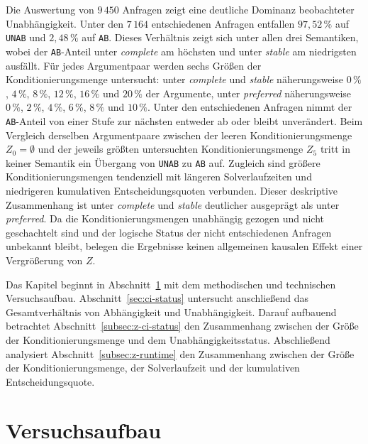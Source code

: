 Die Auswertung von \(9\,450\) Anfragen zeigt eine deutliche Dominanz
beobachteter Unabhängigkeit. Unter den \(7\,164\) entschiedenen Anfragen
entfallen \(97{,}52\,\%\) auf \texttt{UNAB} und \(2{,}48\,\%\) auf
\texttt{AB}. Dieses Verhältnis zeigt sich unter allen drei Semantiken, wobei
der \texttt{AB}-Anteil unter \emph{complete} am höchsten und unter
\emph{stable} am niedrigsten ausfällt. Für jedes Argumentpaar werden sechs
Größen der Konditionierungsmenge untersucht: unter \emph{complete} und
\emph{stable} näherungsweise \(0\,\%\), \(4\,\%\), \(8\,\%\),
\(12\,\%\), \(16\,\%\) und \(20\,\%\) der Argumente, unter
\emph{preferred} näherungsweise \(0\,\%\), \(2\,\%\), \(4\,\%\),
\(6\,\%\), \(8\,\%\) und \(10\,\%\). Unter den entschiedenen Anfragen
nimmt der \texttt{AB}-Anteil von einer Stufe zur nächsten entweder ab oder
bleibt unverändert. Beim Vergleich derselben Argumentpaare zwischen der leeren
Konditionierungsmenge \(Z_0=\emptyset\) und der jeweils größten untersuchten
Konditionierungsmenge \(Z_5\) tritt in keiner Semantik ein Übergang von
\texttt{UNAB} zu \texttt{AB} auf. Zugleich sind größere
Konditionierungsmengen tendenziell mit längeren Solverlaufzeiten und niedrigeren
kumulativen Entscheidungsquoten verbunden. Dieser deskriptive Zusammenhang ist unter
\emph{complete} und \emph{stable} deutlicher ausgeprägt als unter
\emph{preferred}. Da die Konditionierungsmengen unabhängig gezogen
und nicht geschachtelt sind und der logische Status der nicht entschiedenen
Anfragen unbekannt bleibt, belegen die Ergebnisse keinen allgemeinen kausalen
Effekt einer Vergrößerung von \(Z\).

Das Kapitel beginnt in Abschnitt~\ref{sec:trial-design} mit dem methodischen 
und technischen Versuchsaufbau. Abschnitt~\ref{sec:ci-status} untersucht 
anschließend das Gesamtverhältnis von Abhängigkeit und Unabhängigkeit. 
Darauf aufbauend betrachtet Abschnitt~\ref{subsec:z-ci-status} den Zusammenhang
zwischen der Größe der Konditionierungsmenge und dem Unabhängigkeitsstatus.
Abschließend analysiert Abschnitt~\ref{subsec:z-runtime} den Zusammenhang
zwischen der Größe der Konditionierungsmenge, der Solverlaufzeit und der
kumulativen Entscheidungsquote.

\section{Versuchsaufbau}
\label{sec:trial-design}

